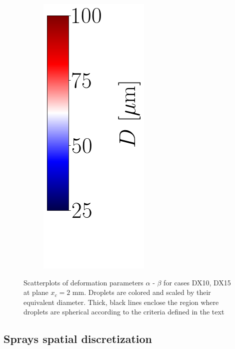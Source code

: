 \begin{figure}[ht]
\begin{subfigure}[b]{0.4\textwidth}
\end{subfigure}
\begin{subfigure}[b]{0.1\textwidth}
	\centering
	\hspace*{0.35in}
   \includegraphics[scale=0.5]{./part3_applications/figures_ch8_resolved/SPRAY_characterization/deformation/scatterplots_colorbar_D_with_blank_space.png}
\end{subfigure}
	\vspace*{-0.2in}
   \caption[Scatterplots of deformation parameters $\alpha$ - $\beta$ for cases DX10, DX15 at plane $x_c = 2$ mm ]{Scatterplots of deformation parameters $\alpha$ - $\beta$ for cases DX10, DX15 at plane $x_c = 2$ mm. Droplets are colored and scaled by their equivalent diameter. Thick, black lines enclose the region where droplets are spherical according to the criteria defined in the text}
\label{fig:ch8_jicf_global_scatterplots_deformation}
\end{figure}




\subsection{Sprays spatial discretization}
\label{subsec:ch8_learning_SLI_in_BIMER}



